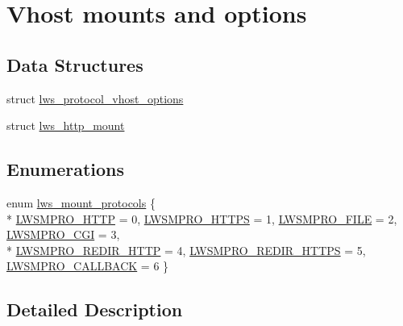\hypertarget{group__vhost-mounts}{}\section{Vhost mounts and options}
\label{group__vhost-mounts}
\subsection*{Data Structures}
\begin{DoxyCompactItemize}
\item 
struct \hyperlink{structlws__protocol__vhost__options}{lws\+\_\+protocol\+\_\+vhost\+\_\+options}
\item 
struct \hyperlink{structlws__http__mount}{lws\+\_\+http\+\_\+mount}
\end{DoxyCompactItemize}
\subsection*{Enumerations}
\begin{DoxyCompactItemize}
\item 
enum \hyperlink{group__vhost-mounts_ga31eca18e50cb4357480f2fcad36ff437}{lws\+\_\+mount\+\_\+protocols} \{ \\*
\hyperlink{group__vhost-mounts_gga31eca18e50cb4357480f2fcad36ff437a1e9f0842b0e85db50fe648ed4ba9a4b0}{L\+W\+S\+M\+P\+R\+O\+\_\+\+H\+T\+TP} = 0, 
\hyperlink{group__vhost-mounts_gga31eca18e50cb4357480f2fcad36ff437afbd10eb4777517ed1f6bfdcf3b9ea1d1}{L\+W\+S\+M\+P\+R\+O\+\_\+\+H\+T\+T\+PS} = 1, 
\hyperlink{group__vhost-mounts_gga31eca18e50cb4357480f2fcad36ff437a42f2361cfe76cd287fa8fcfc502357e2}{L\+W\+S\+M\+P\+R\+O\+\_\+\+F\+I\+LE} = 2, 
\hyperlink{group__vhost-mounts_gga31eca18e50cb4357480f2fcad36ff437a13ab58b01ac6e05f595977f1e0f0db69}{L\+W\+S\+M\+P\+R\+O\+\_\+\+C\+GI} = 3, 
\\*
\hyperlink{group__vhost-mounts_gga31eca18e50cb4357480f2fcad36ff437aec137a2434851bd856ceebfb697b9970}{L\+W\+S\+M\+P\+R\+O\+\_\+\+R\+E\+D\+I\+R\+\_\+\+H\+T\+TP} = 4, 
\hyperlink{group__vhost-mounts_gga31eca18e50cb4357480f2fcad36ff437a8894d16316863077dfe530963ca59f67}{L\+W\+S\+M\+P\+R\+O\+\_\+\+R\+E\+D\+I\+R\+\_\+\+H\+T\+T\+PS} = 5, 
\hyperlink{group__vhost-mounts_gga31eca18e50cb4357480f2fcad36ff437a946a88cf9c852eed2c0317f4115d19da}{L\+W\+S\+M\+P\+R\+O\+\_\+\+C\+A\+L\+L\+B\+A\+CK} = 6
 \}
\end{DoxyCompactItemize}


\subsection{Detailed Description}
